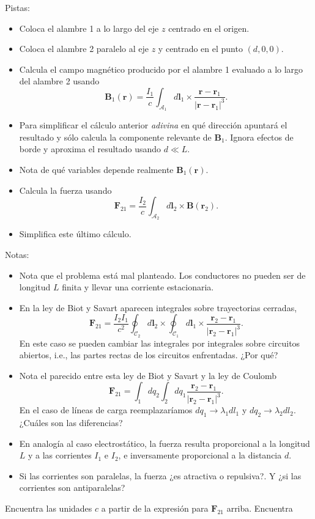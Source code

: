 \documentclass{exam}
\begin{document}
\begin{questions}
    Pistas:
    \begin{itemize}
    \item Coloca el alambre 1 a lo largo del eje $z$ centrado en el origen.
    \item Coloca el alambre 2 paralelo al eje $z$ y centrado en el
      punto $(d,0,0)$.
    \item Calcula el campo magnético producido por el alambre 1
      evaluado a lo largo del alambre 2 usando
      $$\bm B_1(\bm
      r)=\frac{I_1}{c}\int_{\mathcal A_1} d\bm l_1\times \frac{\bm r-\bm r_1}{|\bm
        r-\bm r_1|^3}.$$
    \item Para simplificar el cálculo anterior {\em adivina} en qué
      dirección apuntará el resultado y sólo calcula la componente
      relevante de $\bm B_1$. Ignora efectos de borde y aproxima el
      resultado usando $d\ll L$.
    \item Nota de qué variables depende realmente $\bm B_1(\bm r)$.
    \item Calcula la fuerza usando
      $$\bm F_{21}=\frac{I_2}{c}\int_{\mathcal A_2} d\bm l_2\times \bm B(\bm r_2).$$
    \item Simplifica este último cálculo.
    \end{itemize}
    Notas:
    \begin{itemize}
    \item Nota que el problema está mal planteado. Los conductores no
      pueden ser de longitud $L$ finita y llevar una corriente
      estacionaria.
    \item En la ley de Biot y Savart aparecen integrales sobre
      trayectorias cerradas,
      $$
      \bm F_{21}=\frac{I_2I_1}{c^2}\oint_{\mathcal
        C_2}d\bm l_2\times\oint_{\mathcal C_1}d\bm l_1\times \frac{\bm r_2-\bm r_1}{|\bm
        r_2-\bm r_1|^3}.
      $$
      En este caso se pueden cambiar las integrales por integrales
      sobre circuitos abiertos, i.e., las partes rectas de los
      circuitos enfrentadas. ¿Por qué?
    \item Nota el parecido entre esta ley de Biot y Savart y la ley de
      Coulomb
      $$
      \bm F_{21}=\int_1 dq_2 \int_2 dq_1 \frac{\bm r_2-\bm r_1}{|\bm r_2-\bm r_1|^3}.
      $$
      En el caso de líneas de carga reemplazaríamos
      $dq_1\to\lambda_1dl_1$ y $dq_2\to\lambda_2dl_2$.
      ¿Cuáles son las diferencias?
    \item En analogía al caso electrostático, la fuerza resulta
      proporcional a la longitud $L$ y a las corrientes $I_1$ e $I_2$,
      e inversamente proporcional a la distancia $d$.
    \item Si las corrientes son paralelas, la fuerza ¿es atractiva o
      repulsiva?. Y ¿si las corrientes son antiparalelas?
    \end{itemize}
  \question Encuentra las unidades $c$ a partir de la expresión para
    $\bm F_{21}$ arriba.
  \question Encuentra
    \begin{parts}

\end{parts}
\end{questions}
\end{document}
